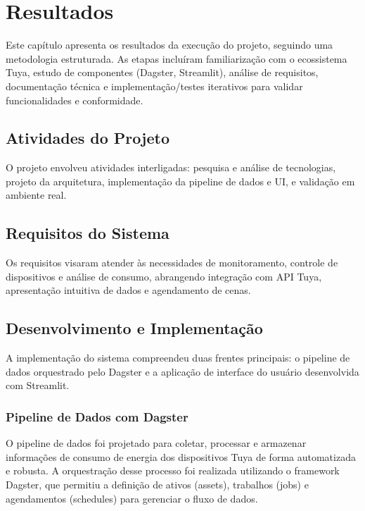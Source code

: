 \chapter{Resultados}
Este capítulo apresenta os resultados da execução do projeto, seguindo uma metodologia estruturada. As etapas incluíram familiarização com o ecossistema Tuya, estudo de componentes (Dagster, Streamlit), análise de requisitos, documentação técnica e implementação/testes iterativos para validar funcionalidades e conformidade.

\section{Atividades do Projeto}
\label{sec:atividades_projeto}
O projeto envolveu atividades interligadas: pesquisa e análise de tecnologias, projeto da arquitetura, implementação da pipeline de dados e UI, e validação em ambiente real.

\section {Requisitos do Sistema}
\label{sec:requisitos_sistema}
Os requisitos visaram atender às necessidades de monitoramento, controle de dispositivos e análise de consumo, abrangendo integração com API Tuya, apresentação intuitiva de dados e agendamento de cenas.

\section{Desenvolvimento e Implementação}
\label{sec:desenvolvimento_implementacao}

A implementação do sistema compreendeu duas frentes principais: o pipeline de dados orquestrado pelo Dagster e a aplicação de interface do usuário desenvolvida com Streamlit.

\subsection{Pipeline de Dados com Dagster}
\label{sec:dagster_pipeline}
O pipeline de dados foi projetado para coletar, processar e armazenar informações de consumo de energia dos dispositivos Tuya de forma automatizada e robusta. A orquestração desse processo foi realizada utilizando o framework Dagster, que permitiu a definição de ativos (assets), trabalhos (jobs) e agendamentos (schedules) para gerenciar o fluxo de dados.


